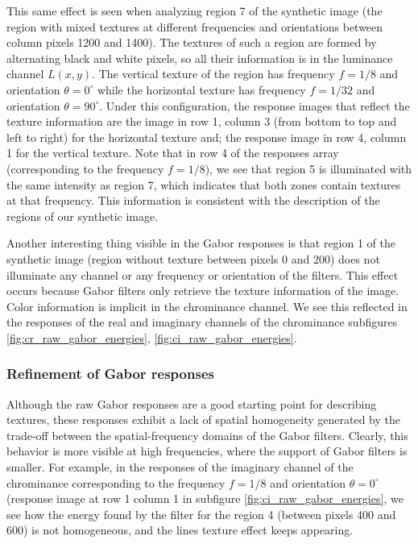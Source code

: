 \documentclass[journal]{IEEEtran}
\begin{document}
This same effect is seen when analyzing region 7 of the synthetic image (the region with mixed textures at different frequencies and orientations between column pixels 1200 and 1400). The textures of such a region are formed by alternating black and white pixels, so all their information is in the luminance channel $L(x, y)$. The vertical texture of the region has frequency $f = 1/8$ and orientation $\theta = 0^\circ$ while the horizontal texture has frequency $f = 1/32$ and orientation $\theta = 90^\circ$. Under this configuration, the response images that reflect the texture information are the image in row 1, column 3  (from bottom to top and left to right) for the horizontal texture and; the response image in row 4, column 1 for the vertical texture. Note that in row 4 of the responses array (corresponding to the frequency $f = 1/8$), we see that region 5 is illuminated with the same intensity as region 7, which indicates that both zones contain textures at that frequency. This information is consistent with the description of the regions of our synthetic image.

Another interesting thing visible in the Gabor responses is that region 1 of the synthetic image (region without texture between pixels 0 and 200) does not illuminate any channel or any frequency or orientation of the filters. This effect occurs because Gabor filters only retrieve the texture information of the image. Color information is implicit in the chrominance channel. We see this reflected in the responses of the real and imaginary channels of the chrominance subfigures \ref{fig:cr_raw_gabor_energies}, \ref{fig:ci_raw_gabor_energies}. 


\subsubsection{Refinement of Gabor responses}

Although the raw Gabor responses are a good starting point for describing textures, these responses exhibit a lack of spatial homogeneity generated by the trade-off between the spatial-frequency domains of the Gabor filters. Clearly, this behavior is more visible at high frequencies, where the support of Gabor filters is smaller. For example, in the responses of the imaginary channel of the chrominance corresponding to the frequency $f=1/8$ and orientation $\theta = 0^\circ$ (response image at row 1 column 1 in subfigure \ref{fig:ci_raw_gabor_energies}, we see how the energy found by the filter for the region 4 (between pixels 400 and 600) is not homogeneous, and the lines texture effect keeps appearing.
\end{document}
